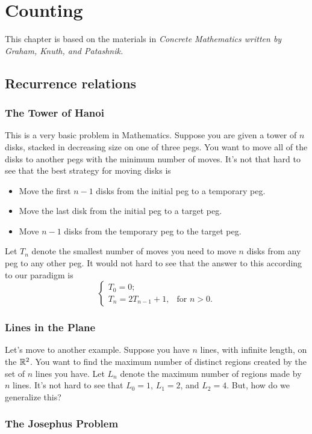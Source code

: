 \chapter{Counting}
\minitoc

This chapter is based on the materials in \it{Concrete Mathematics} written by Graham, Knuth, and Patashnik.

\section{Recurrence relations}
\subsection{The Tower of Hanoi}
This is a very basic problem in Mathematics. Suppose you are given a tower of $n$ disks, stacked in decreasing size on one of three pegs. You want to move all of the disks to another pegs with the minimum number of moves. 
It's not that hard to see that the best strategy for moving disks is
\begin{itemize}
	\item Move the first $n-1$ disks from the initial peg to a temporary peg. 
	\item Move the last disk from the initial peg to a target peg.
	\item Move $n-1$ disks from the temporary peg to the target peg.
\end{itemize}
Let $T_n$ denote the smallest number of moves you need to move $n$ disks from any peg to any other peg. It would not hard to see that the answer to this according to our paradigm is
\[
	\begin{cases}
		T_0 = 0; \\
		T_n = 2T_{n-1} + 1, &\text{for $n > 0$}.
	\end{cases}
\]
\subsection{Lines in the Plane}
Let's move to another example. Suppose you have $n$ lines, with infinite length, on the $\mathbb{R}^2$. You want to find the maximum number of distinct regions created by the set of $n$ lines you have. Let $L_n$ denote the maximum number of regions made by $n$ lines. It's not hard to see that $L_0 = 1$, $L_1 = 2$, and $L_2 = 4$. But, how do we generalize this?


\subsection{The Josephus Problem}
